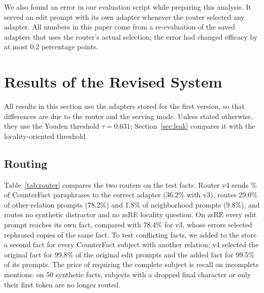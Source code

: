 \documentclass[journal,10pt]{IEEEtran}
\begin{document}
We also found an error in our evaluation script while preparing this analysis. It served
an edit prompt with its own adapter whenever the router selected any adapter. All numbers
in this paper come from a re-evaluation of the saved adapters that uses the router's
actual selection; the error had changed efficacy by at most 0.2 percentage points.



\section{Results of the Revised System}
\label{sec:results}

All results in this section use the adapters stored for the first version, so that
differences are due to the router and the serving mode. Unless stated otherwise, they use
the Youden threshold $\tau=0.631$; Section~\ref{sec:leak} compares it with the
locality-oriented threshold.



\subsection{Routing}
Table~\ref{tab:router} compares the two routers on the test facts. Router v4 sends
\vCfParaRoutePct\% of CounterFact paraphrases to the correct adapter (36.2\% with v3),
routes 29.0\% of other-relation prompts (78.2\%) and 1.8\% of neighborhood prompts (9.8\%),
and routes no synthetic distractor and no zsRE locality question. On zsRE every edit
prompt reaches its own fact, compared with 78.4\% for v3, whose errors selected rephrased
copies of the same fact. To test conflicting facts, we added to the store a second fact
for every CounterFact subject with another relation; v4 selected the original fact for
99.8\% of the original edit prompts and the added fact for 99.5\% of its prompts. The
price of requiring the complete subject is recall on incomplete mentions: on 50
synthetic facts, subjects with a dropped final character or only their first token are
no longer routed.


\end{document}
